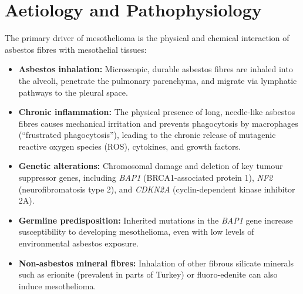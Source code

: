 \section*{Aetiology and Pathophysiology}
The primary driver of mesothelioma is the physical and chemical interaction of asbestos fibres with mesothelial tissues:
\begin{itemize}
    \item \textbf{Asbestos inhalation:} Microscopic, durable asbestos fibres are inhaled into the alveoli, penetrate the pulmonary parenchyma, and migrate via lymphatic pathways to the pleural space.
    \item \textbf{Chronic inflammation:} The physical presence of long, needle-like asbestos fibres causes mechanical irritation and prevents phagocytosis by macrophages (``frustrated phagocytosis''), leading to the chronic release of mutagenic reactive oxygen species (ROS), cytokines, and growth factors.
    \item \textbf{Genetic alterations:} Chromosomal damage and deletion of key tumour suppressor genes, including \textit{BAP1} (BRCA1-associated protein 1), \textit{NF2} (neurofibromatosis type 2), and \textit{CDKN2A} (cyclin-dependent kinase inhibitor 2A).
    \item \textbf{Germline predisposition:} Inherited mutations in the \textit{BAP1} gene increase susceptibility to developing mesothelioma, even with low levels of environmental asbestos exposure.
    \item \textbf{Non-asbestos mineral fibres:} Inhalation of other fibrous silicate minerals such as erionite (prevalent in parts of Turkey) or fluoro-edenite can also induce mesothelioma.
\end{itemize}

